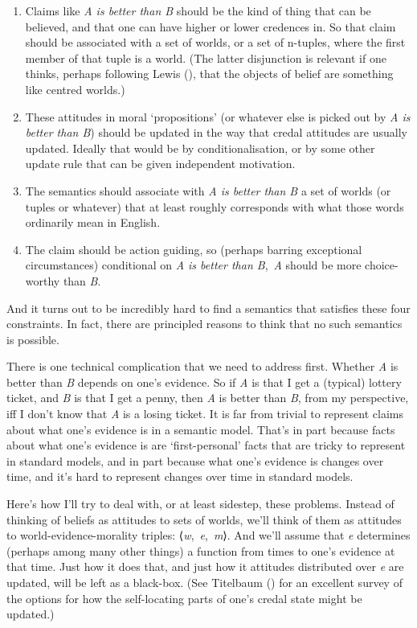 \documentclass[
  10pt,
  letterpaper,
  twoside]{scrbook}
\providecommand{\tightlist}{%
  \setlength{\itemsep}{0pt}\setlength{\parskip}{0pt}}\usepackage{longtable,booktabs,array}
\begin{document}
\begin{enumerate}
\def\labelenumi{\arabic{enumi}.}
\tightlist
\item
  Claims like \emph{A is better than B} should be the kind of thing that
  can be believed, and that one can have higher or lower credences in.
  So that claim should be associated with a set of worlds, or a set of
  n-tuples, where the first member of that tuple is a world. (The latter
  disjunction is relevant if one thinks, perhaps following Lewis
  (), that the objects of belief are
  something like centred worlds.)
\item
  These attitudes in moral `propositions' (or whatever else is picked
  out by \emph{A is better than B}) should be updated in the way that
  credal attitudes are usually updated. Ideally that would be by
  conditionalisation, or by some other update rule that can be given
  independent motivation.
\item
  The semantics should associate with \emph{A is better than B} a set of
  worlds (or tuples or whatever) that at least roughly corresponds with
  what those words ordinarily mean in English.
\item
  The claim should be action guiding, so (perhaps barring exceptional
  circumstances) conditional on \emph{A is better than B},~\emph{A}
  should be more choice-worthy than \emph{B}.
\end{enumerate}

And it turns out to be incredibly hard to find a semantics that
satisfies these four constraints. In fact, there are principled reasons
to think that no such semantics is possible.

There is one technical complication that we need to address first.
Whether \emph{A} is better than \emph{B} depends on one's evidence. So
if \emph{A} is that I get a (typical) lottery ticket, and \emph{B} is
that I get a penny, then \emph{A} is better than \emph{B}, from my
perspective, iff I don't know that \emph{A} is a losing ticket. It is
far from trivial to represent claims about what one's evidence is in a
semantic model. That's in part because facts about what one's evidence
is are `first-personal' facts that are tricky to represent in standard
models, and in part because what one's evidence is changes over time,
and it's hard to represent changes over time in standard models.

Here's how I'll try to deal with, or at least sidestep, these problems.
Instead of thinking of beliefs as attitudes to sets of worlds, we'll
think of them as attitudes to world-evidence-morality triples:
⟨\emph{w},~\emph{e},~\emph{m}⟩. And we'll assume that \emph{e}
determines (perhaps among many other things) a function from times to
one's evidence at that time. Just how it does that, and just how it
attitudes distributed over \emph{e} are updated, will be left as a
black-box. (See Titelbaum () for an
excellent survey of the options for how the self-locating parts of one's
credal state might be updated.)
\end{document}
